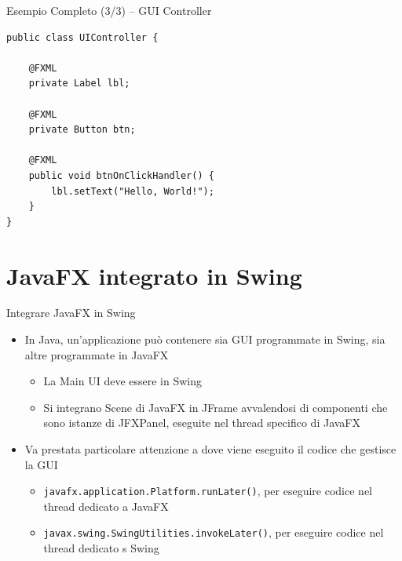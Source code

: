 \documentclass[presentation]{beamer}
\begin{document}
\begin{frame}[fragile]{Esempio Completo (3/3) -- GUI Controller}
\begin{lstlisting}
public class UIController {

	@FXML
	private Label lbl;

	@FXML
	private Button btn;

	@FXML
	public void btnOnClickHandler() {
		lbl.setText("Hello, World!");
	}
}
\end{lstlisting}
\end{frame}

\section{JavaFX integrato in Swing}

\begin{frame}{Integrare JavaFX in Swing}
\begin{itemize}\itemsep20pt
\item In Java, un'applicazione può contenere sia GUI programmate in Swing, sia altre programmate in JavaFX
\begin{itemize}
\item La Main UI deve essere in Swing
\item Si integrano Scene di JavaFX in JFrame avvalendosi di componenti che sono istanze di JFXPanel, eseguite nel thread specifico di JavaFX
\end{itemize}
\item Va prestata particolare attenzione a dove viene eseguito il codice che gestisce la GUI
\begin{itemize}
\item \texttt{javafx.application.Platform.runLater()}, per eseguire codice nel thread dedicato a JavaFX
\item \texttt{javax.swing.SwingUtilities.invokeLater()}, per eseguire codice nel thread dedicato s Swing
\end{itemize}
\end{itemize}
\end{frame}
\end{document}
